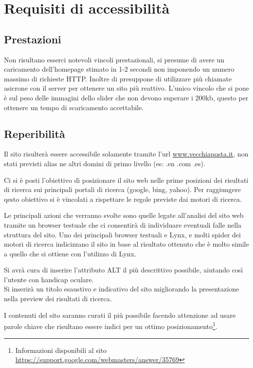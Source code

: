 \documentclass[a4paper,12pt,hidelinks]{report}
\begin{document}
\section{Requisiti di accessibilità}
  \subsection{Prestazioni}
  Non risultano esserci notevoli vincoli prestazionali, si presume di avere un caricamento dell'homepage stimato in 1-2 secondi non imponendo un numero massimo di richieste HTTP.
  Inoltre di presuppone di utilizzare più chiamate asicrone con il server per ottenere un sito più reattivo. L'unico vincolo che si pone è sul peso delle immagini dello slider che
  non devono superare i 200kb, questo per ottenere un tempo di scaricamento accettabile.
  \subsection{Reperibilità}
  Il sito risulterà essere accessibile solamente tramite l'url \url{www.vecchiaposta.it}, non stati previsti alias ne altri domini di primo livello (es: .en .com .es).
  \par Ci si è posti l'obiettivo di posizionare il sito web nelle prime posizioni dei risultati di ricerca sui principali portali di ricerca (google, bing, yahoo). Per raggiungere qesto
  obiettivo si è vincolati a rispettare le regole previste dai motori di ricerca. 
  \par Le principali azioni che verranno svolte sono quelle legate all'analisi del sito web tramite un browser
  testuale che ci consentirà di individuare eventuali falle nella struttura del sito. Uno dei principali browser testuali e Lynx, e molti spider dei motori di ricerca indicizzano il sito
  in base al risultato ottenuto che è molto simile a quello che si ottiene con l'utilizzo di Lynx. 
  \par Si avrà cura di inserire l'attributo ALT il più descrittivo possibile, aiutando così l'utente con handicap oculare. 
  \\Si inserirà un titolo esaustivo e indicativo del sito migliorando la presentazione nella preview dei risultati di ricerca. 
  \par I contenuti del sito saranno curati il più possibile facendo attenzione ad usare parole chiave che risultano essere indici per 
  un ottimo posizionamento\footnote{Informazioni disponibili al sito \url{https://support.google.com/webmasters/answer/35769}}.
  
\end{document}
